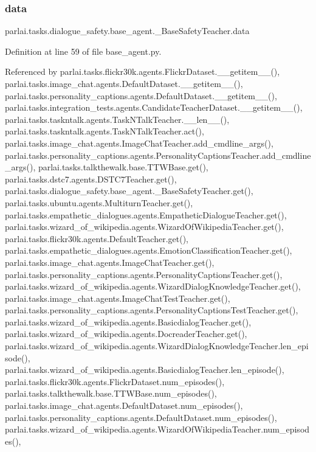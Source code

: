 \subsubsection{\texorpdfstring{data}{data}}
{\footnotesize\ttfamily parlai.\+tasks.\+dialogue\+\_\+safety.\+base\+\_\+agent.\+\_\+\+Base\+Safety\+Teacher.\+data}



Definition at line 59 of file base\+\_\+agent.\+py.



Referenced by parlai.\+tasks.\+flickr30k.\+agents.\+Flickr\+Dataset.\+\_\+\+\_\+getitem\+\_\+\+\_\+(), parlai.\+tasks.\+image\+\_\+chat.\+agents.\+Default\+Dataset.\+\_\+\+\_\+getitem\+\_\+\+\_\+(), parlai.\+tasks.\+personality\+\_\+captions.\+agents.\+Default\+Dataset.\+\_\+\+\_\+getitem\+\_\+\+\_\+(), parlai.\+tasks.\+integration\+\_\+tests.\+agents.\+Candidate\+Teacher\+Dataset.\+\_\+\+\_\+getitem\+\_\+\+\_\+(), parlai.\+tasks.\+taskntalk.\+agents.\+Task\+N\+Talk\+Teacher.\+\_\+\+\_\+len\+\_\+\+\_\+(), parlai.\+tasks.\+taskntalk.\+agents.\+Task\+N\+Talk\+Teacher.\+act(), parlai.\+tasks.\+image\+\_\+chat.\+agents.\+Image\+Chat\+Teacher.\+add\+\_\+cmdline\+\_\+args(), parlai.\+tasks.\+personality\+\_\+captions.\+agents.\+Personality\+Captions\+Teacher.\+add\+\_\+cmdline\+\_\+args(), parlai.\+tasks.\+talkthewalk.\+base.\+T\+T\+W\+Base.\+get(), parlai.\+tasks.\+dstc7.\+agents.\+D\+S\+T\+C7\+Teacher.\+get(), parlai.\+tasks.\+dialogue\+\_\+safety.\+base\+\_\+agent.\+\_\+\+Base\+Safety\+Teacher.\+get(), parlai.\+tasks.\+ubuntu.\+agents.\+Multiturn\+Teacher.\+get(), parlai.\+tasks.\+empathetic\+\_\+dialogues.\+agents.\+Empathetic\+Dialogue\+Teacher.\+get(), parlai.\+tasks.\+wizard\+\_\+of\+\_\+wikipedia.\+agents.\+Wizard\+Of\+Wikipedia\+Teacher.\+get(), parlai.\+tasks.\+flickr30k.\+agents.\+Default\+Teacher.\+get(), parlai.\+tasks.\+empathetic\+\_\+dialogues.\+agents.\+Emotion\+Classification\+Teacher.\+get(), parlai.\+tasks.\+image\+\_\+chat.\+agents.\+Image\+Chat\+Teacher.\+get(), parlai.\+tasks.\+personality\+\_\+captions.\+agents.\+Personality\+Captions\+Teacher.\+get(), parlai.\+tasks.\+wizard\+\_\+of\+\_\+wikipedia.\+agents.\+Wizard\+Dialog\+Knowledge\+Teacher.\+get(), parlai.\+tasks.\+image\+\_\+chat.\+agents.\+Image\+Chat\+Test\+Teacher.\+get(), parlai.\+tasks.\+personality\+\_\+captions.\+agents.\+Personality\+Captions\+Test\+Teacher.\+get(), parlai.\+tasks.\+wizard\+\_\+of\+\_\+wikipedia.\+agents.\+Basicdialog\+Teacher.\+get(), parlai.\+tasks.\+wizard\+\_\+of\+\_\+wikipedia.\+agents.\+Docreader\+Teacher.\+get(), parlai.\+tasks.\+wizard\+\_\+of\+\_\+wikipedia.\+agents.\+Wizard\+Dialog\+Knowledge\+Teacher.\+len\+\_\+episode(), parlai.\+tasks.\+wizard\+\_\+of\+\_\+wikipedia.\+agents.\+Basicdialog\+Teacher.\+len\+\_\+episode(), parlai.\+tasks.\+flickr30k.\+agents.\+Flickr\+Dataset.\+num\+\_\+episodes(), parlai.\+tasks.\+talkthewalk.\+base.\+T\+T\+W\+Base.\+num\+\_\+episodes(), parlai.\+tasks.\+image\+\_\+chat.\+agents.\+Default\+Dataset.\+num\+\_\+episodes(), parlai.\+tasks.\+personality\+\_\+captions.\+agents.\+Default\+Dataset.\+num\+\_\+episodes(), parlai.\+tasks.\+wizard\+\_\+of\+\_\+wikipedia.\+agents.\+Wizard\+Of\+Wikipedia\+Teacher.\+num\+\_\+episodes(), 